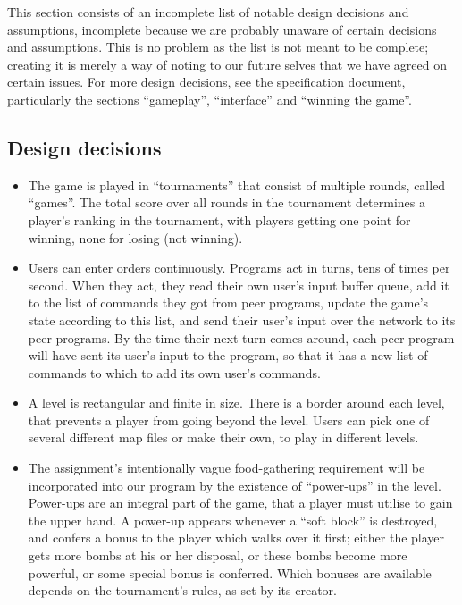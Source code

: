 \documentclass[a4paper,twoside,11pt]{article}
\begin{document}
This section consists of an incomplete list of notable design decisions and assumptions, incomplete because we are probably unaware of certain decisions and assumptions. This is no problem as the list is not meant to be complete; creating it is merely a way of noting to our future selves that we have agreed on certain issues. For more design decisions, see the specification document, particularly the sections ``gameplay'', ``interface'' and ``winning the game''.

\subsection{Design decisions}

\begin{itemize}

    \item The game is played in ``tournaments'' that consist of multiple rounds, called ``games''. The total score over all rounds in the tournament determines a player's ranking in the tournament, with players getting one point for winning, none for losing (not winning).

	\item Users can enter orders continuously. Programs act in turns, tens of times per second. When they act, they read their own user's input buffer queue, add it to the list of commands they got from peer programs, update the game's state according to this list, and send their user's input over the network to its peer programs. By the time their next turn comes around, each peer program will have sent its user's input to the program, so that it has a new list of commands to which to add its own user's commands.

    \item A level is rectangular and finite in size. There is a border around each level, that prevents a player from going beyond the level. Users can pick one of several different map files or make their own, to play in different levels.

    \item The assignment's intentionally vague food-gathering requirement will be incorporated into our program by the existence of ``power-ups'' in the level. Power-ups are an integral part of the game, that a player must utilise to gain the upper hand. A power-up appears whenever a ``soft block'' is destroyed, and confers a bonus to the player which walks over it first; either the player gets more bombs at his or her disposal, or these bombs become more powerful, or some special bonus is conferred. Which bonuses are available depends on the tournament's rules, as set by its creator.


\end{itemize}
\end{document}
